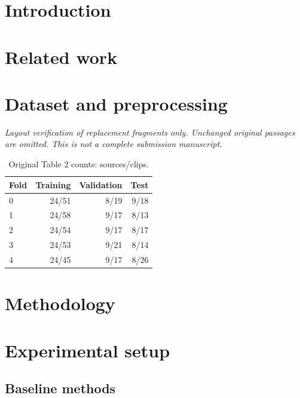 \documentclass[10pt,twocolumn,letterpaper]{article}
\author{Anonymous submission}
\begin{document}
\maketitle

\section{Introduction}

\section{Related work}



\section{Dataset and preprocessing}
\textit{Layout verification of replacement fragments only. Unchanged original passages are omitted. This is not a complete submission manuscript.}

\begin{table}[t]
\centering\small
\begin{tabular}{lrrr}
Fold & Training & Validation & Test\\\hline
0 & 24/51 & 8/19 & 9/18\\
1 & 24/58 & 9/17 & 8/13\\
2 & 24/54 & 9/17 & 8/17\\
3 & 24/53 & 9/21 & 8/14\\
4 & 24/45 & 9/17 & 8/26\\
\end{tabular}
\caption{Original Table 2 counts: sources/clips.}\label{tab:source_partitions}
\end{table}
\section{Methodology}



\section{Experimental setup}
\subsection{Baseline methods}







\FloatBarrier


\clearpage
\appendix

\end{document}
